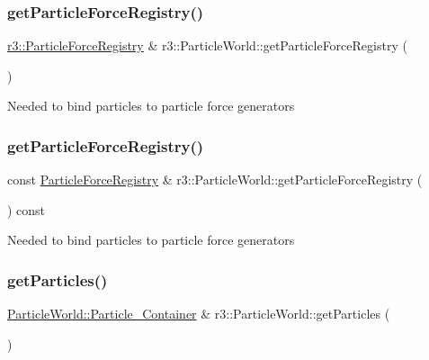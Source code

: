 \subsubsection{\texorpdfstring{get\+Particle\+Force\+Registry()}{getParticleForceRegistry()}\hspace{0.1cm}{\footnotesize\ttfamily [1/2]}}
{\footnotesize\ttfamily \mbox{\hyperlink{classr3_1_1_particle_force_registry}{r3\+::\+Particle\+Force\+Registry}} \& r3\+::\+Particle\+World\+::get\+Particle\+Force\+Registry (\begin{DoxyParamCaption}{ }\end{DoxyParamCaption})}

Needed to bind particles to particle force generators \mbox{\label{classr3_1_1_particle_world_add0e006264e25065ff226eafc0c1a29d}} 
\subsubsection{\texorpdfstring{get\+Particle\+Force\+Registry()}{getParticleForceRegistry()}\hspace{0.1cm}{\footnotesize\ttfamily [2/2]}}
{\footnotesize\ttfamily const \mbox{\hyperlink{classr3_1_1_particle_force_registry}{Particle\+Force\+Registry}} \& r3\+::\+Particle\+World\+::get\+Particle\+Force\+Registry (\begin{DoxyParamCaption}{ }\end{DoxyParamCaption}) const}

Needed to bind particles to particle force generators \mbox{\label{classr3_1_1_particle_world_a00a5014002f28e35ebb59a3f8175db3c}} 
\subsubsection{\texorpdfstring{get\+Particles()}{getParticles()}\hspace{0.1cm}{\footnotesize\ttfamily [1/2]}}
{\footnotesize\ttfamily \mbox{\hyperlink{classr3_1_1_particle_world_aa354f6786c0837674fe8286f00465631}{Particle\+World\+::\+Particle\+\_\+\+Container}} \& r3\+::\+Particle\+World\+::get\+Particles (\begin{DoxyParamCaption}{ }\end{DoxyParamCaption})}

